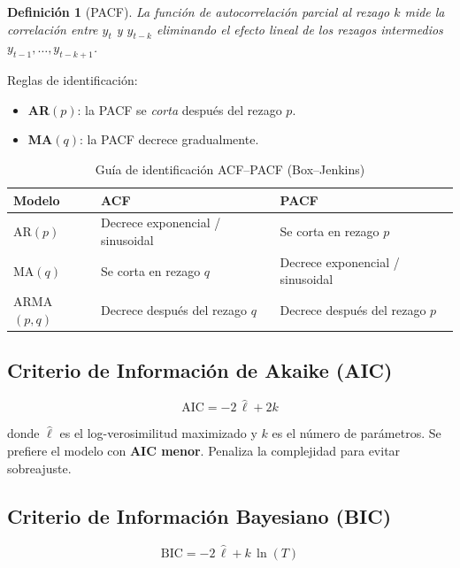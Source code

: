 \documentclass[12pt,a4paper]{article}
\newtheorem{definicion}{Definición}
\begin{document}
\begin{definicion}[PACF]
La \emph{función de autocorrelación parcial} al rezago $k$ mide la correlación entre
$y_t$ y $y_{t-k}$ eliminando el efecto lineal de los rezagos intermedios
$y_{t-1},\ldots,y_{t-k+1}$.
\end{definicion}

Reglas de identificación:
\begin{itemize}
  \item \textbf{AR$(p)$}: la PACF se \emph{corta} después del rezago $p$.
  \item \textbf{MA$(q)$}: la PACF decrece gradualmente.
\end{itemize}

\begin{table}[H]
\centering
\caption{Guía de identificación ACF--PACF (Box--Jenkins)}
\begin{tabular}{lll}
\toprule
\textbf{Modelo} & \textbf{ACF} & \textbf{PACF} \\
\midrule
AR$(p)$     & Decrece exponencial / sinusoidal  & Se corta en rezago $p$ \\
MA$(q)$     & Se corta en rezago $q$            & Decrece exponencial / sinusoidal \\
ARMA$(p,q)$ & Decrece después del rezago $q$    & Decrece después del rezago $p$ \\
\bottomrule
\end{tabular}
\end{table}

\subsection{Criterio de Información de Akaike (AIC)}

\begin{equation}
  \mathrm{AIC} = -2\,\hat{\ell} + 2k
\end{equation}

donde $\hat{\ell}$ es el log-verosimilitud maximizado y $k$ es el número de parámetros.
Se prefiere el modelo con \textbf{AIC menor}. Penaliza la complejidad para evitar sobreajuste.

\subsection{Criterio de Información Bayesiano (BIC)}

\begin{equation}
  \mathrm{BIC} = -2\,\hat{\ell} + k\,\ln(T)
\end{equation}
\end{document}
